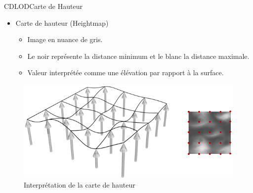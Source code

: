 \documentclass[french]{beamer}
\begin{document}
\begin{frame}{CDLOD}{Carte de Hauteur}


\begin{itemize}
    \item Carte de hauteur (Heightmap)
    \begin{itemize}
        \item Image en nuance de gris. 
        \item Le noir représente la distance minimum et le blanc la distance maximale.
        \item Valeur interprétée comme une élévation par rapport à la surface.
    \end{itemize}

\end{itemize}


\begin{figure}
   \includegraphics[scale=0.60]{img/heightmap.png}
   \caption{Interprétation de la carte de hauteur \protect\footnotemark}
\end{figure}

\end{frame}
\end{document}
